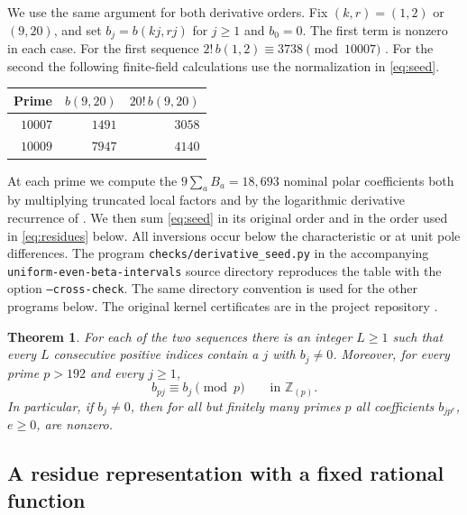 \documentclass[11pt]{article}
\newtheorem{theorem}{Theorem}[section]
\numberwithin{equation}{section}
\newcommand{\Z}{\mathbb Z}
\begin{document}
We use the same argument for both derivative orders. Fix
\((k,r)=(1,2)\) or \((9,20)\), and set \(b_j=b(kj,rj)\) for \(j\ge1\)
and \(b_0=0\). The first term is nonzero in each case. For the first
sequence \(2!\,b(1,2)\equiv3738\pmod{10007}\)
\cite[Section 5]{fifteen}. For the second the following finite-field
calculations use the normalization in \eqref{eq:seed}.
\begin{center}
\begin{tabular}{@{}rrr@{}}\toprule
Prime & \(b(9,20)\) & \(20!\,b(9,20)\)\\\midrule
\(10007\)&\(1491\)&\(3058\)\\
\(10009\)&\(7947\)&\(4140\)\\\bottomrule
\end{tabular}
\end{center}
At each prime we compute the \(9\sum_a B_a=18{,}693\) nominal polar
coefficients both by multiplying truncated local factors and by the
logarithmic derivative recurrence of \cite[Section 6]{two}. We then
sum \eqref{eq:seed} in its original order and in the order used
in \eqref{eq:residues} below. All inversions occur below the
characteristic or at unit pole differences. The program
\texttt{checks/derivative\_seed.py} in the accompanying
\texttt{uniform-even-beta-intervals} source directory reproduces
the table with the option \texttt{--cross-check}. The same directory
convention is used for the other programs below. The original kernel
certificates are in the project repository \cite{repo}.

\begin{theorem}\label{th:seeds}
For each of the two sequences there is an integer \(L\ge1\) such that
every \(L\) consecutive positive indices contain a \(j\) with \(b_j\ne0\).
Moreover, for every prime \(p>192\) and every \(j\ge1\),
\[
                         b_{pj}\equiv b_j\pmod p
                         \qquad\text{in }\Z_{(p)}.
\]
In particular, if \(b_j\ne0\), then for all but finitely many primes
\(p\) all coefficients \(b_{jp^e}\), \(e\ge0\), are nonzero.
\end{theorem}

\subsection{A residue representation with a fixed rational function}
\end{document}
